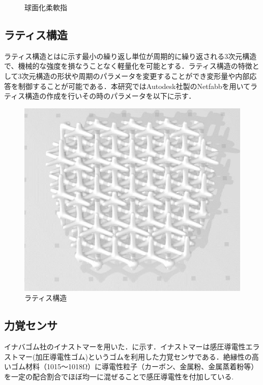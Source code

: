 \begin{figure}[h]
\caption{球面化柔軟指}
\label{fig::semi_finger}
\end{figure}

\subsection{ラティス構造}
ラティス構造とはに示す最小の繰り返し単位が周期的に繰り返される3次元構造で、機械的な強度を損なうことなく軽量化を可能とする\cite{latice}．ラティス構造の特徴として3次元構造の形状や周期のパラメータを変更することができ変形量や内部応答を制御することが可能である．本研究ではAutodesk社製のNetfabbを用いてラティス構造の作成を行いその時のパラメータを以下に示す．

\begin{figure}[b]
 \begin{center}
  \includegraphics[scale=0.4]{../fig/eps/latice.eps}
 \caption{ラティス構造}
  \label{fig::latice}
 \end{center}
\end{figure}


\subsection{力覚センサ}
イナバゴム社のイナストマーを用いた．に示す．イナストマーは感圧導電性エラストマー(加圧導電性ゴム)\cite{kanatsu}というゴムを利用した力覚センサである．絶縁性の高いゴム材料（1015～1018Ω）に導電性粒子（カーボン、金属粉、金属蒸着粉等）を一定の配合割合でほぼ均一に混ぜることで感圧導電性を付加している.

